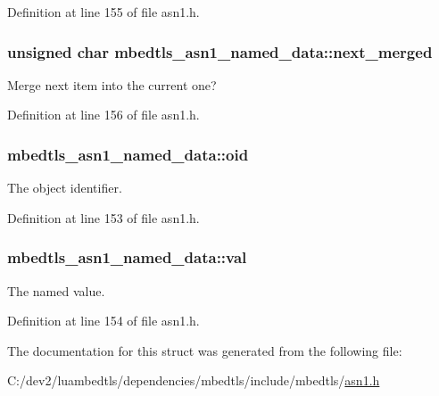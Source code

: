 Definition at line 155 of file asn1.\-h.

\hypertarget{structmbedtls__asn1__named__data_aee15b65458fa2c10596ff7c210ba4ee1}{
\subsubsection[{next\-\_\-merged}]{\setlength{\rightskip}{0pt plus 5cm}unsigned char mbedtls\-\_\-asn1\-\_\-named\-\_\-data\-::next\-\_\-merged}}\label{structmbedtls__asn1__named__data_aee15b65458fa2c10596ff7c210ba4ee1}
Merge next item into the current one? 

Definition at line 156 of file asn1.\-h.

\hypertarget{structmbedtls__asn1__named__data_a0981fcdac0ce14b6922a953adf0624d9}{
\subsubsection[{oid}]{ mbedtls\-\_\-asn1\-\_\-named\-\_\-data\-::oid}}\label{structmbedtls__asn1__named__data_a0981fcdac0ce14b6922a953adf0624d9}
The object identifier. 

Definition at line 153 of file asn1.\-h.

\hypertarget{structmbedtls__asn1__named__data_ad99636f90fae31a96c26df85a7896b07}{
\subsubsection[{val}]{ mbedtls\-\_\-asn1\-\_\-named\-\_\-data\-::val}}\label{structmbedtls__asn1__named__data_ad99636f90fae31a96c26df85a7896b07}
The named value. 

Definition at line 154 of file asn1.\-h.



The documentation for this struct was generated from the following file\-:\begin{DoxyCompactItemize}
\item 
C\-:/dev2/luambedtls/dependencies/mbedtls/include/mbedtls/\hyperlink{asn1_8h}{asn1.\-h}\end{DoxyCompactItemize}
